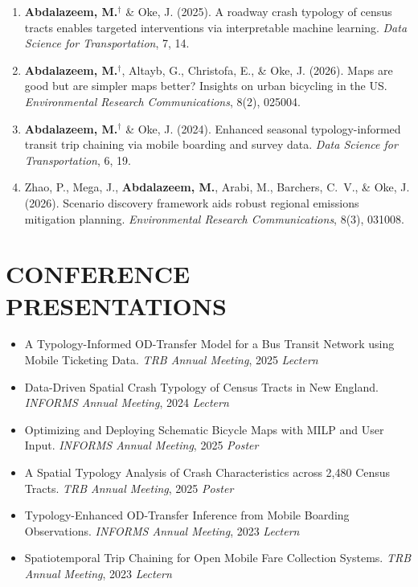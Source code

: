 \documentclass[10pt, a4paper]{article}
\begin{document}
\vspace{4pt}
\begin{enumerate}
  \item \textbf{Abdalazeem, M.}$^\dagger$ \& Oke, J. (2025). A roadway crash typology of census tracts enables targeted interventions via interpretable machine learning. \textit{Data Science for Transportation}, 7, 14.

  \item \textbf{Abdalazeem, M.}$^\dagger$, Altayb, G., Christofa, E., \& Oke, J. (2026). Maps are good but are simpler maps better? Insights on urban bicycling in the US. \textit{Environmental Research Communications}, 8(2), 025004.

  \item \textbf{Abdalazeem, M.}$^\dagger$ \& Oke, J. (2024). Enhanced seasonal typology-informed transit trip chaining via mobile boarding and survey data. \textit{Data Science for Transportation}, 6, 19.

  \item Zhao, P., Mega, J., \textbf{Abdalazeem, M.}, Arabi, M., Barchers, C.~V., \& Oke, J. (2026). Scenario discovery framework aids robust regional emissions mitigation planning. \textit{Environmental Research Communications}, 8(3), 031008.
\end{enumerate}


\section{CONFERENCE PRESENTATIONS}

\begin{itemize}
  \item A Typology-Informed OD-Transfer Model for a Bus Transit Network using Mobile Ticketing Data. \textit{TRB Annual Meeting}, 2025 \hfill \textit{Lectern}
  \item Data-Driven Spatial Crash Typology of Census Tracts in New England. \textit{INFORMS Annual Meeting}, 2024 \hfill \textit{Lectern}
  \item Optimizing and Deploying Schematic Bicycle Maps with MILP and User Input. \textit{INFORMS Annual Meeting}, 2025 \hfill \textit{Poster}
  \item A Spatial Typology Analysis of Crash Characteristics across 2,480 Census Tracts. \textit{TRB Annual Meeting}, 2025 \hfill \textit{Poster}
  \item Typology-Enhanced OD-Transfer Inference from Mobile Boarding Observations. \textit{INFORMS Annual Meeting}, 2023 \hfill \textit{Lectern}
  \item Spatiotemporal Trip Chaining for Open Mobile Fare Collection Systems. \textit{TRB Annual Meeting}, 2023 \hfill \textit{Lectern}
\end{itemize}
\end{document}
